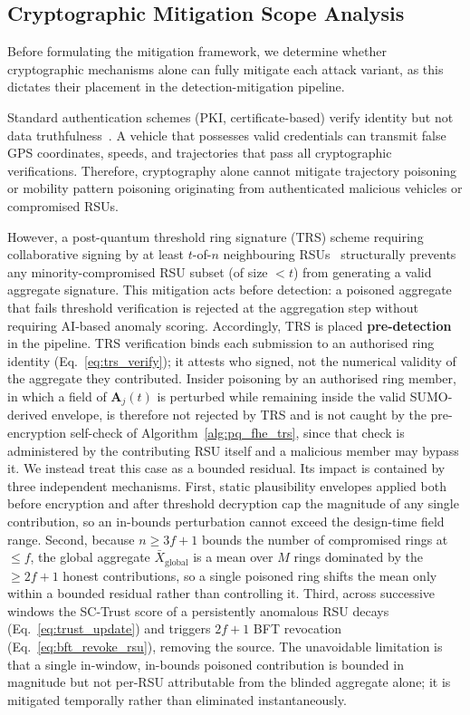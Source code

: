 \documentclass[12pt, a4paper]{report}
\begin{document}
\subsection{Cryptographic Mitigation Scope Analysis}
\label{sec:crypto_scope}

Before formulating the mitigation framework, we determine whether
cryptographic mechanisms alone can fully mitigate each attack variant,
as this dictates their placement in the detection-mitigation pipeline.

Standard authentication schemes (PKI, certificate-based) verify identity
but not data truthfulness~\cite{arif2020}. A vehicle that possesses
valid credentials can transmit false GPS coordinates, speeds, and trajectories
that pass all cryptographic verifications. Therefore, cryptography alone cannot
mitigate trajectory poisoning or mobility pattern poisoning originating from
authenticated malicious vehicles or compromised RSUs.

However, a post-quantum threshold ring signature (TRS) scheme requiring
collaborative signing by at least $t$-of-$n$ neighbouring RSUs~\cite{ahmed2022blockchain}
structurally prevents any minority-compromised RSU subset (of size $< t$) from
generating a valid aggregate signature. This mitigation acts before
detection: a poisoned aggregate that fails threshold verification is rejected
at the aggregation step without requiring AI-based anomaly scoring.
Accordingly, TRS is placed \textbf{pre-detection} in the pipeline.
TRS verification binds each submission to an authorised ring
identity (Eq.~\eqref{eq:trs_verify}); it attests who signed,
not the numerical validity of the aggregate they contributed.
Insider poisoning by an authorised ring member, in which a field of
$\mathbf{A}_j(t)$ is perturbed while remaining inside the valid
SUMO-derived envelope, is therefore not rejected by TRS and is not
caught by the pre-encryption self-check of
Algorithm~\ref{alg:pq_fhe_trs}, since that check is administered by
the contributing RSU itself and a malicious member may bypass it.
We instead treat this case as a bounded residual. Its impact
is contained by three independent mechanisms. First, static
plausibility envelopes applied both before encryption and after
threshold decryption cap the magnitude of any single contribution,
so an in-bounds perturbation cannot exceed the design-time field
range. Second, because $n \geq 3f+1$ bounds the number of
compromised rings at $\leq f$, the global aggregate
$\bar{X}_{\mathrm{global}}$ is a mean over $M$ rings dominated by the
$\geq 2f+1$ honest contributions, so a single poisoned ring shifts
the mean only within a bounded residual rather than controlling it.
Third, across successive windows the SC-Trust score of a
persistently anomalous RSU decays (Eq.~\eqref{eq:trust_update}) and
triggers $2f+1$ BFT revocation (Eq.~\eqref{eq:bft_revoke_rsu}),
removing the source. The unavoidable limitation is that a single
in-window, in-bounds poisoned contribution is bounded in magnitude
but not per-RSU attributable from the blinded aggregate alone; it is
mitigated temporally rather than eliminated instantaneously.
\end{document}
